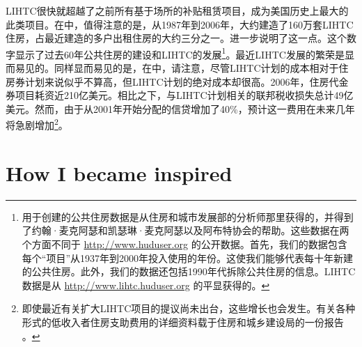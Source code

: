 \documentclass[lang=cn,11pt,a4paper]{elegantpaper}
\begin{document}
LIHTC很快就超越了之前所有基于场所的补贴租赁项目，成为美国历史上最大的此类项目。在中，值得注意的是，从1987年到2006年，大约建造了160万套LIHTC住房，占最近建造的多户出租住房的大约三分之一。进一步说明了这一点。这个数字显示了过去60年公共住房的建设和LIHTC的发展\footnote{用于创建的公共住房数据是从住房和城市发展部的分析师那里获得的，并得到了约翰·麦克阿瑟和凯瑟琳·麦克阿瑟以及阿布特协会的帮助。这些数据在两个方面不同于 \url{http://www.huduser.org} 的公开数据。首先，我们的数据包含每个“项目”从1937年到2000年投入使用的年份。这使我们能够代表每十年新建的公共住房。此外，我们的数据还包括1990年代拆除公共住房的信息。LIHTC数据是从 \url{http://www.lihtc.huduser.org} 的平显获得的。}。最近LIHTC发展的繁荣是显而易见的。同样显而易见的是，在中，请注意，尽管LIHTC计划的成本相对于住房券计划来说似乎不算高，但LIHTC计划的绝对成本却很高。2006年，住房代金券项目耗资近210亿美元。相比之下，与LIHTC计划相关的联邦税收损失总计49亿美元。然而，由于从2001年开始分配的信贷增加了40\%，预计这一费用在未来几年将急剧增加\footnote{即使最近有关扩大LIHTC项目的提议尚未出台，这些增长也会发生。有关各种形式的低收入者住房支助费用的详细资料载于住房和城乡建设局的一份报告 \cite{USCongress2005}。}。

\label{2}




\appendix
\appendixpage
\addappheadtotoc
\section{How I became inspired}
\end{document}

